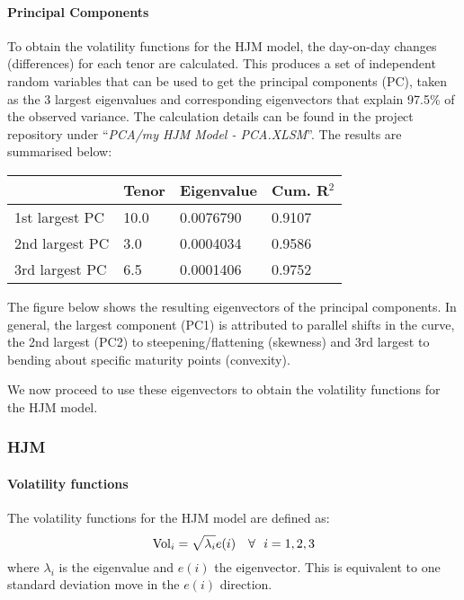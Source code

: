 \documentclass[reqno]{article}
\begin{document}
    \paragraph{Principal Components}\label{principal-components}

    To obtain the volatility functions for the HJM model, the day-on-day
changes (differences) for each tenor are calculated. This produces a set
of independent random variables that can be used to get the  principal
components (PC), taken as the 3 largest eigenvalues and corresponding
eigenvectors that explain 97.5\% of the observed variance. The
calculation details can be found in the project repository under
``\emph{PCA/my HJM Model - PCA.XLSM}''. The results are summarised below:

\begin{longtable}[c]{@{}llll@{}}
\toprule
& Tenor & Eigenvalue & Cum. R$^2$\tabularnewline
\midrule
\endhead
1st largest PC & 10.0 & 0.0076790 & 0.9107\tabularnewline
2nd largest PC & 3.0 & 0.0004034 & 0.9586\tabularnewline
3rd largest PC & 6.5 & 0.0001406 & 0.9752\tabularnewline
\bottomrule
\end{longtable}

The figure below shows the resulting eigenvectors of the principal
components. In general, the largest component (PC1) is attributed to parallel shifts in the curve, the 2nd largest (PC2) to steepening/flattening (skewness) and 3rd largest to bending about specific maturity points (convexity).

    \begin{center}
    \end{center}

    We now proceed to use these eigenvectors to obtain the volatility
functions for the HJM model.

\newpage

    \subsubsection{HJM}\label{hjm}

    \paragraph{Volatility functions}\label{volatility-functions}

    The volatility functions for the HJM model are defined as:
    \begin{equation}
\text{Vol}_i = \sqrt{\lambda_i} \space e(i) \quad \forall ~~  i=1,2,3
\end{equation}
 where \(\lambda_i\) is the eigenvalue and \(e(i)\) the eigenvector.
This is equivalent to one standard deviation move in the \(e(i)\)
direction.
\end{document}
